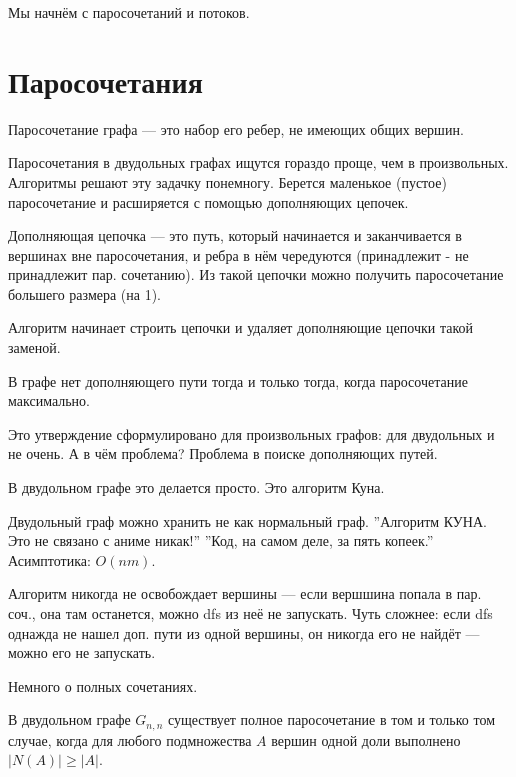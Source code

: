 Мы начнём с паросочетаний и потоков.

\section{Паросочетания}
Паросочетание графа --- это набор его ребер, не имеющих общих вершин.

Паросочетания в двудольных графах ищутся гораздо проще, чем в произвольных.
Алгоритмы решают эту задачку понемногу. 
Берется маленькое (пустое) паросочетание и расширяется с помощью дополняющих цепочек.

Дополняющая цепочка --- это путь, который начинается и заканчивается в вершинах вне паросочетания, и ребра в нём чередуются (принадлежит - не принадлежит пар. сочетанию).
Из такой цепочки можно получить паросочетание большего размера (на 1).

Алгоритм начинает строить цепочки и удаляет дополняющие цепочки такой заменой.
\begin{theorem}
    В графе нет дополняющего пути тогда и только тогда, когда паросочетание максимально.
\end{theorem}
Это утверждение сформулировано для произвольных графов: для двудольных и не очень.
А в чём проблема? 
Проблема в поиске дополняющих путей.

В двудольном графе это делается просто. 
Это алгоритм Куна.

Двудольный граф можно хранить не как нормальный граф.
''Алгоритм КУНА. Это не связано с аниме никак!''
''Код, на самом деле, за пять копеек.''
Асимптотика: $O(nm)$.




Алгоритм никогда не освобождает вершины --- если вершшина попала в пар. соч., она там останется, можно dfs из неё не запускать.
Чуть сложнее: если dfs однажда не нашел доп. пути из одной вершины, он никогда его не найдёт --- можно его не запускать.


Немного о полных сочетаниях.
\begin{theorem}
В двудольном графе $G_{n,n}$ существует полное паросочетание в том и только том случае, когда для любого подмножества $A$ вершин одной доли выполнено $|N(A)| \geqslant |A|$. 
\end{theorem}

